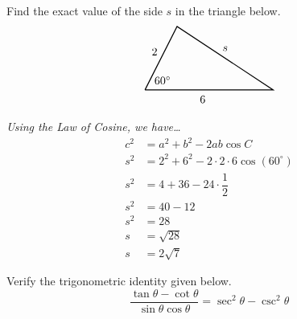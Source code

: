 \documentclass[12pt,letterpaper]{exam}
\begin{document}
\begin{questions}
\newpage
\question[10] Find the exact value of the side $s$ in the triangle below.
	\[
	\begin{tikzpicture}
	\draw[line width=0.03cm] (0,0) -- (1,2) -- (4,0) -- (0,0);
	\node at (0.55,0.3) {$60^\circ$};
	\node at (0.3,1.2) {$2$};
	\node at (1.8,-0.3) {$6$};
	\node at (2.5,1.3) {$s$};
	\end{tikzpicture}
	\] \pspace

{\itshape \sol Using the Law of Cosine, we have\dots
	\[
	\begin{aligned}
	c^2&= a^2 + b^2 - 2ab \cos C \\[0.3cm]
	s^2&= 2^2 + 6^2 - 2 \cdot 2 \cdot 6 \cos(60^\circ) \\[0.3cm]
	s^2&= 4 + 36 - 24 \cdot \dfrac{1}{2} \\[0.3cm]
	s^2&= 40 - 12 \\[0.3cm]
	s^2&= 28 \\[0.3cm]
	s&= \sqrt{28} \\[0.3cm]
	s&= 2 \sqrt{7}
	\end{aligned}
	\]
}



\newpage
\question[10] Verify the trigonometric identity given below.
	\[
	\dfrac{\tan \theta - \cot \theta}{\sin \theta \cos \theta}= \sec^2 \theta - \csc^2 \theta
	\] 


\end{questions}
\end{document}
